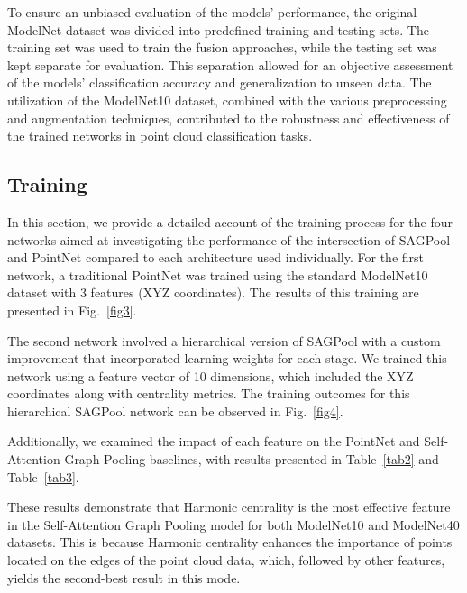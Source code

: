 \documentclass[conference]{IEEEtran}
\begin{document}
To ensure an unbiased evaluation of the models' performance, the original ModelNet dataset
 was divided into predefined training and testing sets. The training set was used to train the fusion approaches, 
 while the testing set was kept separate for evaluation. This separation allowed for an objective assessment of the models'
  classification accuracy and generalization to unseen data. The utilization of the ModelNet10 dataset, combined with
   the various preprocessing and augmentation techniques, contributed to the robustness and effectiveness of the trained
    networks in point cloud classification tasks.


\subsection{Training }
In this section, we provide a detailed account of the training process for the four networks aimed at 
investigating the performance of the intersection of SAGPool and PointNet compared to each architecture used individually. 
For the first network, a traditional PointNet was trained using the standard ModelNet10 dataset with 3 features (XYZ coordinates). 
The results of this training are presented in Fig.~\ref{fig3}.

The second network involved a hierarchical version of SAGPool with a custom improvement that incorporated 
learning weights for each stage. We trained this network using a feature vector of 10 dimensions, which included
 the XYZ coordinates along with centrality metrics. The training outcomes for this hierarchical SAGPool network 
 can be observed in Fig.~\ref{fig4}.


Additionally, we examined the impact of each feature on the PointNet and Self-Attention Graph Pooling baselines, 
with results presented in Table~\ref{tab2} and Table~\ref{tab3}.


These results demonstrate that Harmonic centrality is the most effective
 feature in the Self-Attention Graph Pooling model for both ModelNet10 and ModelNet40 datasets. This is because Harmonic
  centrality enhances the importance of points located on the edges of the point cloud data, which, followed by other features,
   yields the second-best result in this mode.
\end{document}
